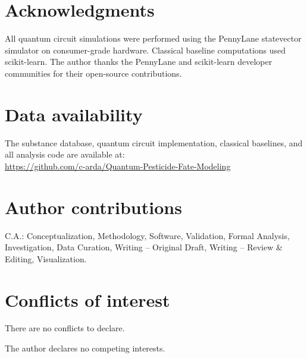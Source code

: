 \documentclass[twoside,twocolumn,9pt]{article}
\begin{document}
\section*{Acknowledgments}

All quantum circuit simulations were performed using the PennyLane
statevector simulator on consumer-grade hardware. Classical baseline
computations used scikit-learn. The author thanks the PennyLane and
scikit-learn developer communities for their open-source contributions.


\section*{Data availability}

The substance database, quantum circuit implementation, classical baselines,
and all analysis code are available at:\\
\url{https://github.com/c-arda/Quantum-Pesticide-Fate-Modeling}


\section*{Author contributions}
C.A.: Conceptualization, Methodology, Software, Validation, Formal Analysis, Investigation, Data Curation, Writing -- Original Draft, Writing -- Review \& Editing, Visualization.

\section*{Conflicts of interest}
There are no conflicts to declare.

The author declares no competing interests.







\balance



\end{document}
